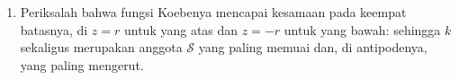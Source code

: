 \begin{problem}
\begin{enumerate}[resume]
{        $[0, z]$; sedangkan untuk batas bawahnya: jika $\abs{f(z)} < \frac14$,
        maka ruas $[0, f(z)]$ terletak di $f(\mathbb D)$ menurut
        pertanyaan 7; lalu tariklah ia kembali lewat $f^{-1}$ ---
        yang  menurut
        \cref{cor:b3:residues:openmapping} --- lalu batasi
        $\abs{f(z)} = \int_\gamma\abs{f'(\zeta)}
        \,\abs{\dd\zeta} \geq \int_0^r\frac{1 - t}{(1 +
        t)^3}\,\dd t$, dengan memakai $\abs{\dd\zeta} \geq
        \dd\abs\zeta$)}.
  \item Periksalah bahwa fungsi Koebenya mencapai kesamaan pada
        keempat batasnya, di $z = r$ untuk yang atas dan
        $z = -r$ untuk yang bawah: sehingga $k$ sekaligus
        merupakan anggota $\mathcal S$ yang paling memuai dan, di antipodenya, yang paling
        mengerut.
\end{enumerate}


\end{problem}
